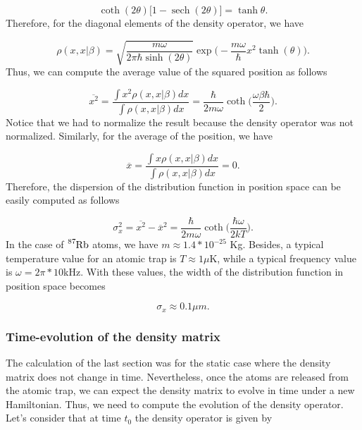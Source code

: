 \documentclass{article}
\DeclareMathOperator{\sech}{sech}
\begin{document}
\begin{equation}
    \coth (2\theta) \big[1-\sech(2\theta) \big] = \tanh\theta.
\end{equation}
%
Therefore, for the diagonal elements of the density operator, we have 

\begin{equation}
    \rho(x,x|\beta) = \sqrt{\frac{m\omega}{2\pi\hbar\sinh(2\theta)}} \exp \bigg( -\frac{m\omega}{\hbar}x^{2} \tanh(\theta) \bigg).
\end{equation}
%
Thus, we can compute the average value of the squared position as follows

\begin{equation}
    \overline{x^{2}} = \frac{\int x^{2} \rho(x,x|\beta) dx}{\int \rho(x,x|\beta) dx} = \frac{\hbar}{2m\omega} \coth\bigg( \frac{\omega\beta\hbar}{2} \bigg).
\end{equation}
%
Notice that we had to normalize the result because the density operator was not normalized. Similarly, for the average of the position, we have

\begin{equation}
    \overline{x} = \frac{\int x \rho(x,x|\beta) dx}{\int \rho(x,x|\beta) dx} = 0.
\end{equation}
%
Therefore, the dispersion of the distribution function in position space can be easily computed as follows

\begin{equation}\label{dispersion_harmonic_oscillator}
    \sigma_{x}^{2} = \overline{x^{2}} - \overline{x}^{2} = \frac{\hbar}{2m\omega} \coth \bigg( \frac{\hbar\omega}{2kT} \bigg).
\end{equation}
%
In the case of $\ce{^{87}_{}Rb}$ atoms, we have $m\approx1.4*10^{-25}$ Kg. Besides, a typical temperature value for an atomic trap is $T\approx 1 \mu$K, while a typical frequency value is $\omega = 2\pi *10$kHz. With these values, the width of the distribution function in position space becomes

\begin{equation}
    \sigma_{x} \approx 0.1 \mu m.
\end{equation}

\subsubsection{Time-evolution of the density matrix}
The calculation of the last section was for the static case where the density matrix does not change in time. Nevertheless, once the atoms are released from the atomic trap, we can expect the density matrix to evolve in time under a new Hamiltonian. Thus, we need to compute the evolution of the density operator. Let's consider that at time $t_{0}$ the density operator is given by
\end{document}
